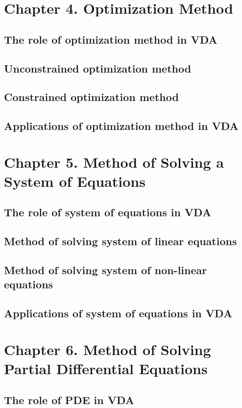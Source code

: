 \newpage
\section{Chapter 4. Optimization Method}
\subsection{The role of optimization method in VDA}
\subsection{Unconstrained optimization method}
\subsection{Constrained optimization method}
\subsection{Applications of optimization method in VDA}

\section{Chapter 5. Method of Solving a System of Equations}
\subsection{The role of system of equations in VDA}
\subsection{Method of solving system of linear equations}
\subsection{Method of solving system of non-linear equations}
\subsection{Applications of system of equations in VDA}

\section{Chapter 6. Method of Solving Partial Differential Equations}
\subsection{The role of PDE in VDA}
